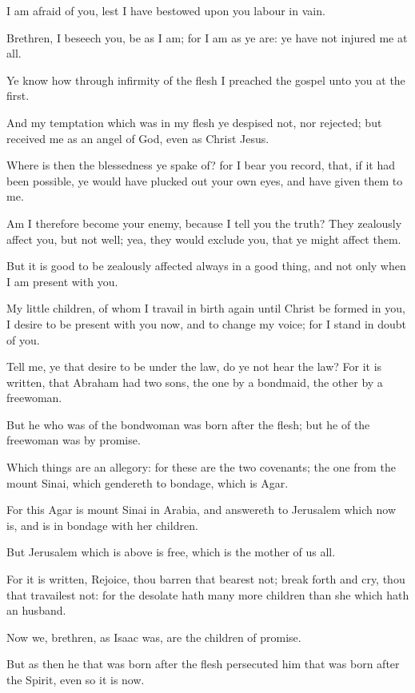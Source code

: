 \verse I am afraid of you, lest I have bestowed upon you labour in vain.

\verse Brethren, I beseech you, be as I am; for I am as ye are: ye have not injured me at all.

\verse Ye know how through infirmity of the flesh I preached the gospel unto you at the first.

\verse And my temptation which was in my flesh ye despised not, nor rejected; but received me as an angel of God, even as Christ Jesus.

\verse Where is then the blessedness ye spake of? for I bear you record, that, if it had been possible, ye would have plucked out your own eyes, and have given them to me.

\verse Am I therefore become your enemy, because I tell you the truth?  \verse They zealously affect you, but not well; yea, they would exclude you, that ye might affect them.

\verse But it is good to be zealously affected always in a good thing, and not only when I am present with you.

\verse My little children, of whom I travail in birth again until Christ be formed in you, \verse I desire to be present with you now, and to change my voice; for I stand in doubt of you.

\verse Tell me, ye that desire to be under the law, do ye not hear the law?  \verse For it is written, that Abraham had two sons, the one by a bondmaid, the other by a freewoman.

\verse But he who was of the bondwoman was born after the flesh; but he of the freewoman was by promise.

\verse Which things are an allegory: for these are the two covenants; the one from the mount Sinai, which gendereth to bondage, which is Agar.

\verse For this Agar is mount Sinai in Arabia, and answereth to Jerusalem which now is, and is in bondage with her children.

\verse But Jerusalem which is above is free, which is the mother of us all.

\verse For it is written, Rejoice, thou barren that bearest not; break forth and cry, thou that travailest not: for the desolate hath many more children than she which hath an husband.

\verse Now we, brethren, as Isaac was, are the children of promise.

\verse But as then he that was born after the flesh persecuted him that was born after the Spirit, even so it is now.


